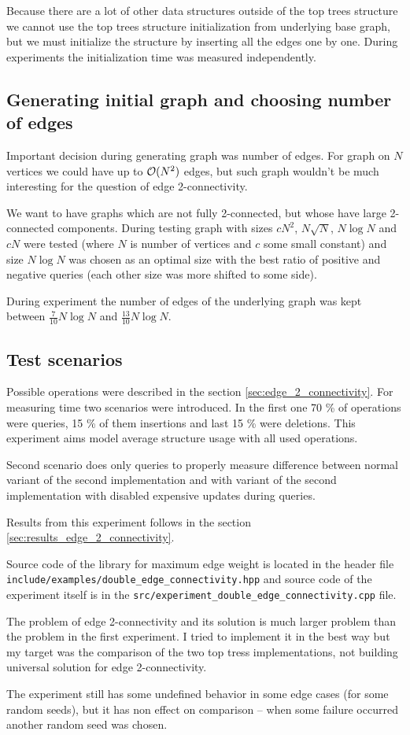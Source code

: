 Because there are a lot of other data structures outside of the top trees
structure we cannot use the top trees structure initialization from underlying
base graph, but we must initialize the structure by inserting all the edges one
by one. During experiments the initialization time was measured independently.

\subsection{Generating initial graph and choosing number of edges}

Important decision during generating graph was number of edges. For graph on $N$
vertices we could have up to ${\cal O}(N^2)$ edges, but such graph wouldn't be much
interesting for the question of edge 2-connectivity.

We want to have graphs which are not fully 2-connected, but whose have large
2-connected components. During testing graph with sizes $cN^2$, $N\sqrt{N}$,
$N\log N$ and $cN$ were tested (where $N$ is number of vertices and $c$ some
small constant) and size $N\log N$ was chosen as an optimal size with the best
ratio of positive and negative queries (each other size was more shifted to some
side).

During experiment the number of edges of the underlying graph was kept between
$\frac{7}{10}N\log N$ and $\frac{13}{10}N\log N$.

\subsection{Test scenarios}

Possible operations were described in the section \ref{sec:edge_2_connectivity}.
For measuring time two scenarios were introduced. In the first one 70 \% of
operations were queries, 15 \% of them insertions and last 15 \% were deletions.
This experiment aims model average structure usage with all used operations.

Second scenario does only queries to properly measure difference between normal
variant of the second implementation and with variant of the second
implementation with disabled expensive updates during queries.

Results from this experiment follows in the section \ref{sec:results_edge_2_connectivity}.

Source code of the library for maximum edge weight is located in the header file
\texttt{include/examples/double\_edge\_connectivity.hpp} and source code of the
experiment itself is in the \texttt{src/experiment\_double\_edge\_connectivity.cpp} file.

\bigskip

The problem of edge 2-connectivity and its solution is much larger problem than
the problem in the first experiment. I tried to implement it in the best way
but my target was the comparison of the two top tress implementations, not
building universal solution for edge 2-connectivity.

The experiment still has some undefined behavior in some edge cases (for some
random seeds), but it has non effect on comparison -- when some failure occurred
another random seed was chosen.
